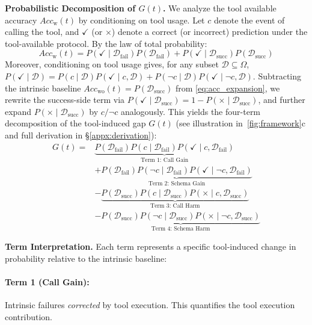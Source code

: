 \textbf{Probabilistic Decomposition of $G(t)$.}
We analyze the tool available accuracy \( Acc_{\mathrm{w}}(t) \) by conditioning on tool usage. Let $c$ denote the event of calling the tool, and $\checkmark$ (or $\times$) denote a correct (or incorrect) prediction under the tool-available protocol. By the law of total probability:
%
\begin{equation}
    Acc_{\mathrm{w}}(t) = P(\checkmark \mid \mathcal{D}_{\text{fail}}) P(\mathcal{D}_{\text{fail}}) + P(\checkmark \mid \mathcal{D}_{\text{succ}}) P(\mathcal{D}_{\text{succ}})
    \label{eq:acc_expansion}
\end{equation}
%
Moreover, conditioning on tool usage gives, for any subset $\mathcal D \subseteq \Omega$,
$
P(\checkmark\mid \mathcal D)=P(c\mid \mathcal D)P(\checkmark\mid c,\mathcal D)+P(\neg c\mid \mathcal D)P(\checkmark\mid \neg c,\mathcal D).
$
Subtracting the intrinsic baseline $Acc_{\mathrm{wo}}(t)=P(\mathcal D_{\mathrm{succ}})$ from \cref{eq:acc_expansion}, we rewrite the success-side term via
$P(\checkmark\mid \mathcal D_{\mathrm{succ}})=1-P(\times\mid \mathcal D_{\mathrm{succ}})$,
and further expand $P(\times\mid \mathcal D_{\mathrm{succ}})$ by $c/\neg c$ analogously.
This yields the four-term decomposition of the tool-induced gap $G(t)$ (see illustration in~\cref{fig:framework}c and full derivation in \S \ref{appx:derivation}):
%
\begin{equation}
\begin{aligned}
G(t) = & \underbrace{P(\mathcal D_{\text{fail}}) P(c \mid \mathcal D_{\text{fail}}) P(\checkmark \mid c, \mathcal D_{\text{fail}})}_{\text{Term 1: Call Gain}} \\
& + \underbrace{P(\mathcal D_{\text{fail}}) P(\neg c \mid \mathcal D_{\text{fail}}) P(\checkmark \mid \neg c, \mathcal D_{\text{fail}})}_{\text{Term 2: Schema Gain}} \\
& - \underbrace{P(\mathcal D_{\text{succ}}) P(c \mid \mathcal D_{\text{succ}}) P(\times \mid c, \mathcal D_{\text{succ}})}_{\text{Term 3: Call Harm}} \\
& - \underbrace{P(\mathcal D_{\text{succ}}) P(\neg c \mid \mathcal D_{\text{succ}}) P(\times \mid \neg c, \mathcal D_{\text{succ}})}_{\text{Term 4: Schema Harm}}
\end{aligned}
\label{eq:decomposition}
\end{equation}

\textbf{Term Interpretation.}  
Each term represents a specific tool-induced change in probability relative to the intrinsic baseline:
%
    \paragraph{Term 1 (Call Gain):} Intrinsic failures \textit{corrected} by tool execution. This quantifies the tool execution contribution.
